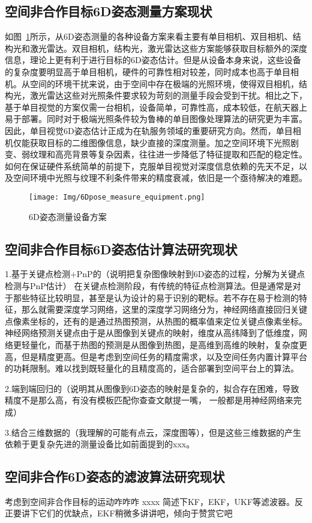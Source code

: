\subsection{空间非合作目标6D姿态测量方案现状}
如图~\ref{fig:6D_equip}所示，从6D姿态测量的各种设备方案来看主要有单目相机\cite{PAULY2023339, 9802504,Zhang_2024_CVPR,Liu_2024_CVPR}、双目相机\cite{GXXB202106018, zhang2017optimization,Fan2024}、结构光\cite{laser_stereo,hu2023non,sun2022relative}和激光雷达\cite{10801205,10823741}。双目相机，结构光，激光雷达这些方案能够获取目标额外的深度信息，理论上更有利于进行目标的6D姿态估计。但是从设备本身来说，这些设备的复杂度要明显高于单目相机，硬件的可靠性相对较差，同时成本也高于单目相机。从空间的环境干扰来说，由于空间中存在极端的光照环境，使得双目相机，结构光，激光雷达这些对光照条件要求较为苛刻的测量手段会受到干扰\cite{rs15092286,tian2023all}。相比之下，基于单目视觉的方案仅需一台相机，设备简单，可靠性高，成本较低，在航天器上易于部署。同时对于极端光照条件较为鲁棒的单目图像处理算法的研究更为丰富。因此，单目视觉6D姿态估计正成为在轨服务领域的重要研究方向。然而，单目相机仅能获取目标的二维图像信息，缺少直接的深度测量。加之空间环境下光照剧变、弱纹理和高亮背景等复杂因素，往往进一步降低了特征提取和匹配的稳定性\cite{Hu_2021_CVPR,wang2022revisiting}。如何在保证硬件系统简单的前提下，克服单目视觉对深度信息依赖的先天不足，以及空间环境中光照与纹理不利条件带来的精度衰减，依旧是一个亟待解决的难题。
\begin{figure}[htbp]
	\centering
	\texttt{[image: Img/6Dpose\_measure\_equipment.png]}
	\caption{6D姿态测量设备方案}
	\label{fig:6D_equip}
\end{figure}

\subsection{空间非合作目标6D姿态估计算法研究现状}





1.基于关键点检测+PnP的（说明把复杂图像映射到6D姿态的过程，分解为关键点检测与PnP估计）
在关键点检测阶段，有传统的特征点检测算法。但是通常是对于那些特征比较明显，甚至是认为设计的易于识别的靶标。若不存在易于检测的特征，那么就需要深度学习网络，这里的深度学习网络分为，神经网络直接回归关键点像素坐标的，还有的是通过热图预测，从热图的概率值来定位关键点像素坐标。神经网络预测关键点由于是从图像到关键点的映射，维度从高纬降到了低维度，网络更轻量化，而基于热图的预测是从图像到热图，是高维到高维的映射，复杂度更高，但是精度更高。但是考虑到空间任务的精度需求，以及空间任务内置计算平台的功耗限制。难以找到既轻量化的且精度高的，适合部署到空间平台上的算法。



2.端到端回归的（说明其从图像到6D姿态的映射是复杂的，拟合存在困难，导致精度不是那么高，有没有模板匹配你查查文献提一嘴， 一般都是用神经网络来完成）

3.结合三维数据的（我理解的可能有点云，深度图等），但是这些三维数据的产生依赖于更复杂先进的测量设备比如前面提到的xxx。



\subsection{空间非合作6D姿态的滤波算法研究现状}

考虑到空间非合作目标的运动咋咋咋
xxxx
简述下KF，EKF，UKF等滤波器。反正要讲下它们的优缺点，EKF稍微多讲讲吧，倾向于赞赏它吧
